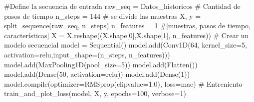 \documentclass[
  us-letterpaper,
]{scrreprt}
\newenvironment{Shaded}{\begin{snugshade}}{\end{snugshade}}
\newcommand{\BuiltInTok}[1]{\textcolor[rgb]{0.00,0.23,0.31}{#1}}
\newcommand{\CommentTok}[1]{\textcolor[rgb]{0.37,0.37,0.37}{#1}}
\newcommand{\DecValTok}[1]{\textcolor[rgb]{0.68,0.00,0.00}{#1}}
\newcommand{\FloatTok}[1]{\textcolor[rgb]{0.68,0.00,0.00}{#1}}
\newcommand{\NormalTok}[1]{\textcolor[rgb]{0.00,0.23,0.31}{#1}}
\newcommand{\OperatorTok}[1]{\textcolor[rgb]{0.37,0.37,0.37}{#1}}
\newcommand{\StringTok}[1]{\textcolor[rgb]{0.13,0.47,0.30}{#1}}
\theoremstyle{plain}
\theoremstyle{definition}
\theoremstyle{definition}
\theoremstyle{remark}
\begin{document}
\begin{Shaded}
\begin{Highlighting}[]
\CommentTok{\#Define la secuencia de entrada}
\NormalTok{raw\_seq }\OperatorTok{=}\NormalTok{ Datos\_historicos  }
\CommentTok{\# Cantidad de pasos de tiempo}
\NormalTok{n\_steps }\OperatorTok{=} \DecValTok{144}
\CommentTok{\# se divide las muestras}
\NormalTok{X, y }\OperatorTok{=}\NormalTok{ split\_sequence(raw\_seq, n\_steps)}
\NormalTok{n\_features }\OperatorTok{=} \DecValTok{1}
\CommentTok{\#[muestras, pasos de tiempo, características]}
\NormalTok{X }\OperatorTok{=}\NormalTok{ X.reshape((X.shape[}\DecValTok{0}\NormalTok{],X.shape[}\DecValTok{1}\NormalTok{], n\_features))  }
\CommentTok{\# Crear un modelo secuencial}
\NormalTok{model }\OperatorTok{=}\NormalTok{ Sequential()}
\NormalTok{model.add(Conv1D(}\DecValTok{64}\NormalTok{, kernel\_size}\OperatorTok{=}\DecValTok{5}\NormalTok{, }
\NormalTok{  activation}\OperatorTok{=}\StringTok{\textquotesingle{}relu\textquotesingle{}}\NormalTok{,input\_shape}\OperatorTok{=}\NormalTok{(n\_steps, n\_features)))}
\NormalTok{model.add(MaxPooling1D(pool\_size}\OperatorTok{=}\DecValTok{5}\NormalTok{))}
\NormalTok{model.add(Flatten())}
\NormalTok{model.add(Dense(}\DecValTok{50}\NormalTok{, activation}\OperatorTok{=}\StringTok{\textquotesingle{}relu\textquotesingle{}}\NormalTok{))}
\NormalTok{model.add(Dense(}\DecValTok{1}\NormalTok{))}
\NormalTok{model.}\BuiltInTok{compile}\NormalTok{(optimizer}\OperatorTok{=}\NormalTok{RMSprop(clipvalue}\OperatorTok{=}\FloatTok{1.0}\NormalTok{), loss}\OperatorTok{=}\StringTok{\textquotesingle{}mae\textquotesingle{}}\NormalTok{)}
\CommentTok{\# Entreniento}
\NormalTok{train\_and\_plot\_loss(model, X, y, epochs}\OperatorTok{=}\DecValTok{100}\NormalTok{, verbose}\OperatorTok{=}\DecValTok{1}\NormalTok{)}
\end{Highlighting}
\end{Shaded}
\end{document}
